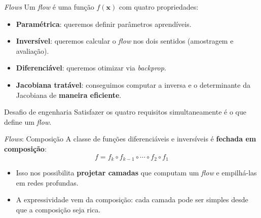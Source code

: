 \documentclass[aspectratio=169,xcolor=dvipsnames]{beamer}
\begin{document}
  \begin{frame}{\textit{Flows}}
    Um \textit{flow} é uma função $f(\mathbf{x})$ com quatro
    propriedades:
    \vspace{0.4em}
    \begin{itemize}
      \item \textbf{Paramétrica}: queremos definir parâmetros
      aprendíveis.
      \item \textcolor{FlowGreen}{\textbf{Inversível}}: queremos
      calcular o \textit{flow} nos dois sentidos (amostragem e
      avaliação).
      \item \textbf{Diferenciável}: queremos otimizar via
      \textit{backprop}.
      \item \textbf{Jacobiana tratável}: conseguimos computar a
      inversa e o determinante da Jacobiana de \textbf{maneira
      eficiente}.
    \end{itemize}
    \begin{alertblock}{Desafio de engenharia}
      Satisfazer os quatro requisitos simultaneamente é o que define
      um \textit{flow}.
    \end{alertblock}
  \end{frame}

  \begin{frame}{\textit{Flows}: Composição}
    A classe de funções diferenciáveis e inversíveis é \textbf{fechada
    em composição}:
    \vspace{0.3em}
    \[
      f = f_{k} \circ f_{k-1} \circ \cdots \circ f_{2} \circ f_{1}
    \]
    \vspace{0.3em}
    \begin{itemize}
      \item Isso nos possibilita \textbf{projetar camadas} que computam
      um \textit{flow} e empilhá-las em redes profundas.
      \item A expressividade vem da composição: cada camada pode ser
      simples desde que a composição seja rica.
    \end{itemize}
  \end{frame}
\end{document}
